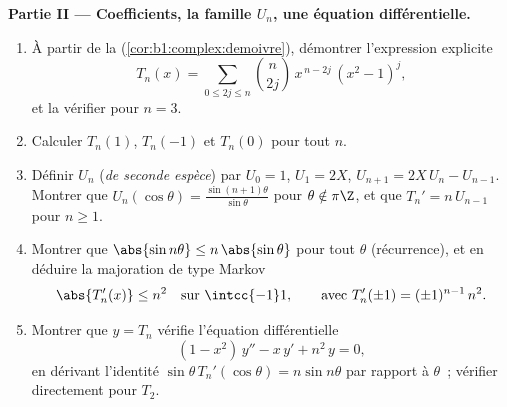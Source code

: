 \begin{problem}
\medskip
\noindent\textbf{Partie II --- Coefficients, la famille $U_n$, une
équation différentielle.}
\begin{enumerate}[resume]
  \item À partir de la 
        (\cref{cor:b1:complex:demoivre}), démontrer l'expression
        explicite
        \[
        T_n(x) = \sum_{0 \leq 2j \leq n} \binom{n}{2j}\,
        x^{\,n-2j}\,(x^2 - 1)^j ,
        \]
        et la vérifier pour $n = 3$.
  \item Calculer $T_n(1)$, $T_n(-1)$ et $T_n(0)$ pour tout $n$.
  \item Définir $U_n$ (\emph{de seconde espèce}) par $U_0 = 1$, $U_1
        = 2X$, $U_{n+1} = 2X\,U_n - U_{n-1}$. Montrer que
        $U_n(\cos\theta) = \frac{\sin(n+1)\theta}{\sin\theta}$ pour
        $\theta \notin \pi\Z$, et que $T_n' = n\,U_{n-1}$ pour $n
        \geq 1$.
  \item Montrer que $\abs{\sin n\theta} \leq n\,\abs{\sin\theta}$
        pour tout $\theta$ (récurrence), et en déduire la majoration
        de type Markov
        \[
        \abs{T_n'(x)} \leq n^2
        \quad\text{sur } \intcc{-1}1,
        \qquad\text{avec } T_n'(\pm1) = (\pm1)^{n-1}\,n^2 .
        \]
  \item Montrer que $y = T_n$ vérifie l'équation différentielle
        \[
        (1 - x^2)\,y'' - x\,y' + n^2\,y = 0 ,
        \]
        en dérivant l'identité $\sin\theta\, T_n'(\cos\theta) =
        n\sin n\theta$ par rapport à $\theta$~; vérifier directement
        pour $T_2$.
\end{enumerate}


\end{problem}

